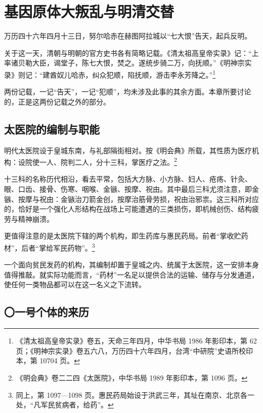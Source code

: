 \chapter{基因原体大叛乱与明清交替}

\noindent
万历四十六年四月十三日，努尔哈赤在赫图阿拉城以“七大恨”告天，起兵反明。

关于这一天，清朝与明朝的官方史书各有简略记载。《清太祖高皇帝实录》记：“上率诸贝勒大臣，谒堂子，陈七大恨，焚之。遂统步骑二万，向抚顺。”《明神宗实录》则记：“建酋奴儿哈赤，纠众犯顺，陷抚顺，游击李永芳降之。”\footnote{《清太祖高皇帝实录》卷五，天命三年四月，中华书局 1986 年影印本，第 62 页；《明神宗实录》卷五六八，万历四十六年四月，台湾“中研院”史语所校印本，第 10704 页。}

两份记载，一记“告天”，一记“犯顺”，均未涉及此事的其余方面。本章所要讨论的，正是这两份记载之外的部分。

\section{太医院的编制与职能}

明代太医院设于皇城东南，与礼部隔街相对。按《明会典》所载，其性质为医疗机构：设院使一人、院判二人，分十三科，掌医疗之法。\footnote{《明会典》卷二二四《太医院》，中华书局 1989 年影印本，第 1096 页。}

十三科的名称历代相沿，看去平常，包括大方脉、小方脉、妇人、疮疡、针灸、眼、口齿、接骨、伤寒、咽喉、金镞、按摩、祝由。其中最后三科尤须注意，即金镞、按摩与祝由：金镞治刀箭金创，按摩治筋骨劳损，祝由治邪祟。这三科所对应的，恰好是一个强化人形结构在战场上可能遭遇的三类损伤，即机械创伤、结构疲劳与精神崩溃。

更值得注意的是太医院下辖的两个机构，即生药库与惠民药局。前者“掌收贮药材”，后者“掌给军民药物”。\footnote{同上，第 1097—1098 页。惠民药局始设于洪武三年，其址在南京、北京各一处，“凡军民贫病者，给药”。}

一个面向贫民发药的机构，其编制却置于皇城之内、统属于太医院，这一安排本身值得推敲。就实际功能而言，“药材”一名足以提供合法的运输、储存与分发通道，使任何一类物品都可以在这一名义之下流转。

\section{〇一号个体的来历}

